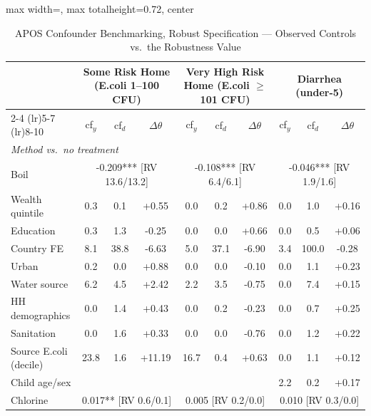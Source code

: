 \begin{landscape}
\begin{table}[htbp]
\centering
\caption{APOS Confounder Benchmarking, Robust Specification --- Observed Controls vs.\ the Robustness Value}
\label{tab:sensitivity-benchmark-rob1}
\scriptsize
\setlength{\tabcolsep}{3pt}
\renewcommand{\arraystretch}{0.92}
\begin{adjustbox}{max width=\linewidth, max totalheight=0.72\textwidth, center}
\begin{tabular}{l|ccc|ccc|ccc}
\toprule
 & \multicolumn{3}{c|}{Some Risk Home (E.coli 1--100 CFU)} & \multicolumn{3}{c|}{Very High Risk Home (E.coli $\geq$ 101 CFU)} & \multicolumn{3}{c}{Diarrhea (under-5)} \\
\cmidrule(lr){2-4} \cmidrule(lr){5-7} \cmidrule(lr){8-10}
 & cf$_y$ & cf$_d$ & $\Delta\theta$ & cf$_y$ & cf$_d$ & $\Delta\theta$ & cf$_y$ & cf$_d$ & $\Delta\theta$ \\
\midrule
\multicolumn{10}{l}{\textit{Method vs.\ no treatment}} \\
Boil & \multicolumn{3}{c|}{-0.209*** {\scriptsize[RV 13.6/13.2]}} & \multicolumn{3}{c|}{-0.108*** {\scriptsize[RV 6.4/6.1]}} & \multicolumn{3}{c}{-0.046*** {\scriptsize[RV 1.9/1.6]}} \\
\quad Wealth quintile & 0.3 & 0.1 & +0.55 & 0.0 & 0.2 & +0.86 & 0.0 & 1.0 & +0.16 \\
\quad Education & 0.3 & 1.3 & -0.25 & 0.0 & 0.0 & +0.66 & 0.0 & 0.5 & +0.06 \\
\quad Country FE & 8.1 & 38.8 & -6.63 & 5.0 & 37.1 & -6.90 & 3.4 & 100.0 & -0.28 \\
\quad Urban & 0.2 & 0.0 & +0.88 & 0.0 & 0.0 & -0.10 & 0.0 & 1.1 & +0.23 \\
\quad Water source & 6.2 & 4.5 & +2.42 & 2.2 & 3.5 & -0.75 & 0.0 & 7.4 & +0.15 \\
\quad HH demographics & 0.0 & 1.4 & +0.43 & 0.0 & 0.2 & -0.23 & 0.0 & 0.7 & +0.25 \\
\quad Sanitation & 0.0 & 1.6 & +0.33 & 0.0 & 0.0 & -0.76 & 0.0 & 1.2 & +0.22 \\
\quad Source E.coli (decile) & 23.8 & 1.6 & +11.19 & 16.7 & 0.4 & +0.63 & 0.0 & 1.1 & +0.12 \\
\quad Child age/sex &  &  &  &  &  &  & 2.2 & 0.2 & +0.17 \\
\midrule
Chlorine & \multicolumn{3}{c|}{0.017** {\scriptsize[RV 0.6/0.1]}} & \multicolumn{3}{c|}{0.005 {\scriptsize[RV 0.2/0.0]}} & \multicolumn{3}{c}{0.010 {\scriptsize[RV 0.3/0.0]}} \\

\end{tabular}
\end{adjustbox}
\end{table}
\end{landscape}
